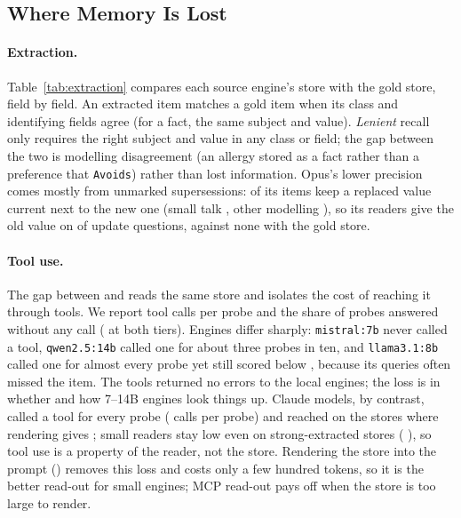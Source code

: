 \subsection{Where Memory Is Lost}

\paragraph{Extraction.} Table~\ref{tab:extraction} compares each source engine's store with the
gold store, field by field. An extracted item matches a gold item when its class and identifying
fields agree (for a fact, the same subject and value). \emph{Lenient} recall only requires the
right subject and value in any class or field; the gap between the two is modelling disagreement
(an allergy stored as a fact rather than a preference that \texttt{Avoids}) rather than lost
information. Opus's lower precision comes mostly from unmarked supersessions:
 of its items keep a replaced value current next to the new
one (small talk , other modelling
), so its readers give the old value on
 of update questions, against none with the gold store.

\begin{table}[t]
\centering
\caption{Write-in quality by source engine: field-level recall (strict and lenient), precision,
and erasure behaviour (tombstones written per erasure requested). Gemma@$A$ and Opus@$A$: the
strong extractor's store of $A$'s dialogue.}
\label{tab:extraction}
\end{table}

\paragraph{Tool use.} The gap between  and  reads the same store and isolates
the cost of reaching it through tools. We report tool calls per probe and the share of probes
answered without any call ( at both tiers). Engines differ sharply:
\texttt{mistral:7b} never called a tool, \texttt{qwen2.5:14b} called one for about three probes in
ten, and \texttt{llama3.1:8b} called one for almost every probe yet still scored below ,
because its queries often missed the item. The tools returned no errors to the local engines; the loss is in
whether and how 7--14B engines look things up. Claude models, by contrast, called a tool for
every probe ( calls per probe) and reached
 on the stores where rendering gives ;
small readers stay low even on strong-extracted stores ( ), so
tool use is a property of the reader, not the store. Rendering the store into the prompt ()
removes this loss and costs only a few hundred tokens, so it is the better read-out for small
engines; MCP read-out pays off when the store is too large to render.

